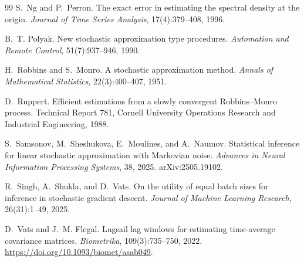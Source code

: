 \documentclass[11pt,a4paper,oneside]{report}
\numberwithin{equation}{chapter}
\begin{document}
\begin{thebibliography}{99}
S.~Ng and P.~Perron.
The exact error in estimating the spectral density at the origin.
\emph{Journal of Time Series Analysis}, 17(4):379--408, 1996.

B.~T. Polyak.
New stochastic approximation type procedures.
\emph{Automation and Remote Control}, 51(7):937--946, 1990.

H.~Robbins and S.~Monro.
A stochastic approximation method.
\emph{Annals of Mathematical Statistics}, 22(3):400--407, 1951.

D.~Ruppert.
Efficient estimations from a slowly convergent Robbins--Monro process.
Technical Report 781, Cornell University Operations Research and Industrial
Engineering, 1988.

S.~Samsonov, M.~Sheshukova, E.~Moulines, and A.~Naumov.
Statistical inference for linear stochastic approximation with Markovian
noise. \emph{Advances in Neural Information Processing Systems}, 38, 2025.
arXiv:2505.19102.

R.~Singh, A.~Shukla, and D.~Vats.
On the utility of equal batch sizes for inference in stochastic gradient
descent. \emph{Journal of Machine Learning Research}, 26(31):1--49, 2025.

D.~Vats and J.~M. Flegal.
Lugsail lag windows for estimating time-average covariance matrices.
\emph{Biometrika}, 109(3):735--750, 2022.
\url{https://doi.org/10.1093/biomet/asab049}.
\end{thebibliography}

\clearpage
\appendix

\end{document}
